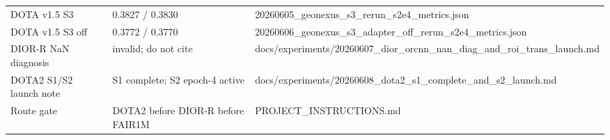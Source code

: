 \begin{table}[t]
\begin{tabular}{lll}
DOTA v1.5 S3 & 0.3827 / 0.3830 & 20260605\_geonexus\_s3\_rerun\_s2e4\_metrics.json \\
DOTA v1.5 S3 off & 0.3772 / 0.3770 & 20260606\_geonexus\_s3\_adapter\_off\_rerun\_s2e4\_metrics.json \\
DIOR-R NaN diagnosis & invalid; do not cite & docs/experiments/20260607\_dior\_orcnn\_nan\_diag\_and\_roi\_trans\_launch.md \\
DOTA2 S1/S2 launch note & S1 complete; S2 epoch-4 active & docs/experiments/20260608\_dota2\_s1\_complete\_and\_s2\_launch.md \\
Route gate & DOTA2 before DIOR-R before FAIR1M & PROJECT\_INSTRUCTIONS.md \\
\bottomrule
\end{tabular}
\end{table}

